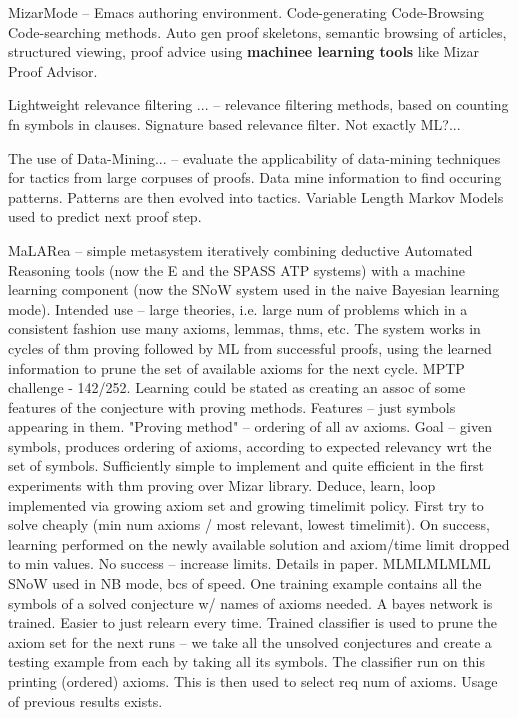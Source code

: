 \documentclass{article}
\begin{document}
MizarMode \cite{MizarMode} -- Emacs authoring environment. Code-generating
Code-Browsing Code-searching methods. Auto gen proof skeletons, semantic
browsing of articles, structured viewing, proof advice using \textbf{machinee
learning tools} like Mizar Proof Advisor. 

Lightweight relevance filtering ... \cite{LightweightPaulson} -- relevance
filtering methods, based on counting fn symbols in clauses. Signature based
relevance filter. Not exactly ML?...

The use of Data-Mining... \cite{DataMiningAFT} -- evaluate the applicability of
data-mining techniques for tactics from large corpuses of proofs. Data mine
information to find occuring patterns. Patterns are then evolved into tactics.
Variable Length Markov Models used to predict next proof step.

MaLARea \cite{MaLARea} -- simple metasystem iteratively combining deductive
Automated Reasoning tools (now the E and the SPASS ATP systems) with a machine
learning component (now the SNoW system used in the  naive  Bayesian  learning
mode). Intended use -- large theories, i.e. large num of problems which in
a consistent fashion use many axioms, lemmas, thms, etc. The system works in
cycles of thm proving followed by ML from successful proofs, using the learned
information to prune the set of available axioms for the next cycle. MPTP
challenge - 142/252. Learning could be stated as creating an assoc of some
features of the conjecture with proving methods. Features -- just symbols
appearing in them. "Proving method" -- ordering of all av axioms. Goal -- given
symbols, produces ordering of axioms, according to expected relevancy wrt the
set of symbols. Sufficiently simple to implement and quite efficient in the
first experiments with thm proving over Mizar library. Deduce, learn, loop
implemented via growing axiom set and growing timelimit policy. First try to
solve cheaply (min num axioms / most relevant, lowest timelimit). On success,
learning performed on the newly available solution and axiom/time limit dropped
to min values. No success -- increase limits. Details in paper. MLMLMLMLML SNoW
used in NB mode, bcs of speed. One training example contains all the symbols of
a solved conjecture w/ names of axioms needed. A bayes network is trained.
Easier to just relearn every time. Trained classifier is used to prune the
axiom set for the next runs -- we take all the unsolved conjectures and create
a testing example from each by taking all its symbols. The classifier run on
this printing (ordered) axioms. This is then used to select req num of axioms.
Usage of previous results exists.
\end{document}
